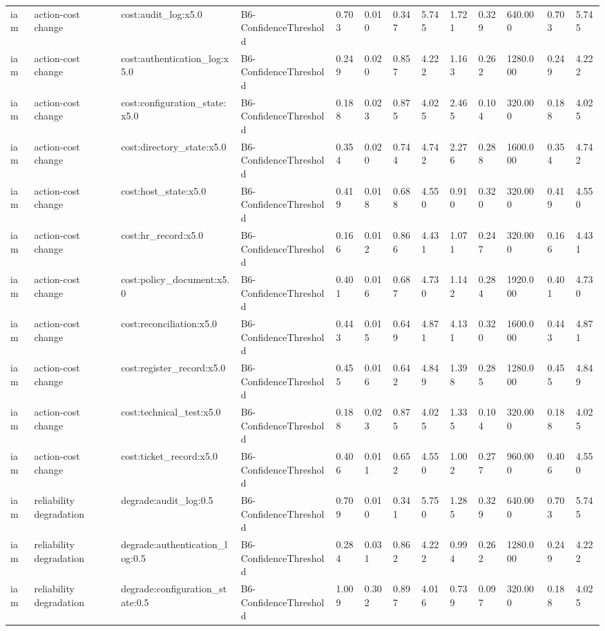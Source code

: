 \begin{table}[!ht]
{\begin{tabular}{lllllllllllll}
iam & action-cost change & cost:audit\_log:x5.0 & B6-ConfidenceThreshold & 0.703 & 0.010 & 0.347 & 5.745 & 1.721 & 0.329 & 640.000 & 0.703 & 5.745 \\
iam & action-cost change & cost:authentication\_log:x5.0 & B6-ConfidenceThreshold & 0.249 & 0.020 & 0.857 & 4.222 & 1.163 & 0.262 & 1280.000 & 0.249 & 4.222 \\
iam & action-cost change & cost:configuration\_state:x5.0 & B6-ConfidenceThreshold & 0.188 & 0.023 & 0.875 & 4.025 & 2.465 & 0.104 & 320.000 & 0.188 & 4.025 \\
iam & action-cost change & cost:directory\_state:x5.0 & B6-ConfidenceThreshold & 0.354 & 0.020 & 0.744 & 4.742 & 2.276 & 0.288 & 1600.000 & 0.354 & 4.742 \\
iam & action-cost change & cost:host\_state:x5.0 & B6-ConfidenceThreshold & 0.419 & 0.018 & 0.688 & 4.550 & 0.910 & 0.320 & 320.000 & 0.419 & 4.550 \\
iam & action-cost change & cost:hr\_record:x5.0 & B6-ConfidenceThreshold & 0.166 & 0.012 & 0.866 & 4.431 & 1.071 & 0.247 & 320.000 & 0.166 & 4.431 \\
iam & action-cost change & cost:policy\_document:x5.0 & B6-ConfidenceThreshold & 0.401 & 0.016 & 0.687 & 4.730 & 1.142 & 0.284 & 1920.000 & 0.401 & 4.730 \\
iam & action-cost change & cost:reconciliation:x5.0 & B6-ConfidenceThreshold & 0.443 & 0.015 & 0.649 & 4.871 & 4.131 & 0.320 & 1600.000 & 0.443 & 4.871 \\
iam & action-cost change & cost:register\_record:x5.0 & B6-ConfidenceThreshold & 0.455 & 0.016 & 0.642 & 4.849 & 1.398 & 0.285 & 1280.000 & 0.455 & 4.849 \\
iam & action-cost change & cost:technical\_test:x5.0 & B6-ConfidenceThreshold & 0.188 & 0.023 & 0.875 & 4.025 & 1.335 & 0.104 & 320.000 & 0.188 & 4.025 \\
iam & action-cost change & cost:ticket\_record:x5.0 & B6-ConfidenceThreshold & 0.406 & 0.011 & 0.652 & 4.550 & 1.002 & 0.277 & 960.000 & 0.406 & 4.550 \\
iam & reliability degradation & degrade:audit\_log:0.5 & B6-ConfidenceThreshold & 0.709 & 0.010 & 0.341 & 5.750 & 1.285 & 0.329 & 640.000 & 0.703 & 5.745 \\
iam & reliability degradation & degrade:authentication\_log:0.5 & B6-ConfidenceThreshold & 0.284 & 0.031 & 0.862 & 4.222 & 0.994 & 0.262 & 1280.000 & 0.249 & 4.222 \\
iam & reliability degradation & degrade:configuration\_state:0.5 & B6-ConfidenceThreshold & 1.009 & 0.302 & 0.897 & 4.016 & 0.739 & 0.097 & 320.000 & 0.188 & 4.025 \\

\end{tabular}}
\end{table}
